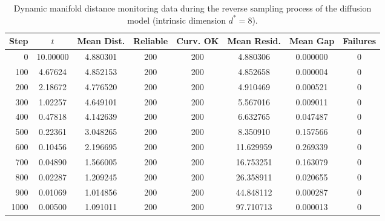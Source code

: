 \documentclass[11pt]{article}
\begin{document}
\begin{table}[htbp]
\centering
\label{tab:manifold_monitoring_d8}
\begin{tabular}{r c c c c c c c}
\toprule
Step & $t$ & Mean Dist. & Reliable & Curv. OK & Mean Resid. & Mean Gap & Failures \\
\midrule
0    & 10.00000 & 4.880301 & 200 & 200 & 4.880306  & 0.000000 & 0 \\
100  & 4.67624  & 4.852153 & 200 & 200 & 4.852658  & 0.000004 & 0 \\
200  & 2.18672  & 4.776520 & 200 & 200 & 4.910469  & 0.000521 & 0 \\
300  & 1.02257  & 4.649101 & 200 & 200 & 5.567016  & 0.009011 & 0 \\
400  & 0.47818  & 4.142639 & 200 & 200 & 6.632765  & 0.047487 & 0 \\
500  & 0.22361  & 3.048265 & 200 & 200 & 8.350910  & 0.157566 & 0 \\
600  & 0.10456  & 2.196695 & 200 & 200 & 11.629959 & 0.269339 & 0 \\
700  & 0.04890  & 1.566005 & 200 & 200 & 16.753251 & 0.163079 & 0 \\
800  & 0.02287  & 1.209245 & 200 & 200 & 26.358911 & 0.020655 & 0 \\
900  & 0.01069  & 1.014856 & 200 & 200 & 44.848112 & 0.000287 & 0 \\
1000 & 0.00500  & 1.091011 & 200 & 200 & 97.710713 & 0.000013 & 0 \\
\bottomrule
\end{tabular}
\vspace{0.5em}
\caption{Dynamic manifold distance monitoring data during the reverse sampling process of the diffusion model (intrinsic dimension $d^*=8$).}
\end{table}
\end{document}
